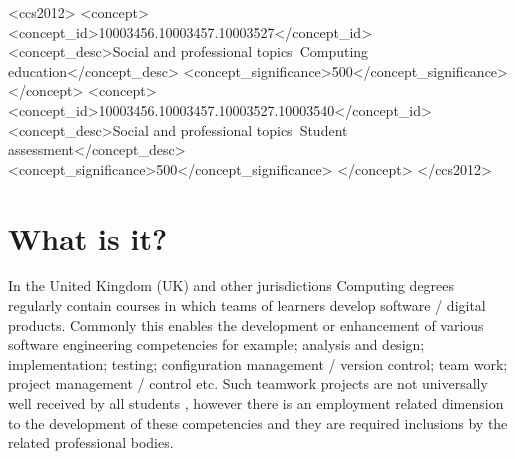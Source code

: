 \documentclass[sigconf, anonymous=true]{acmart}
\begin{document}
\begin{CCSXML}
<ccs2012>
   <concept>
       <concept_id>10003456.10003457.10003527</concept_id>
       <concept_desc>Social and professional topics~Computing education</concept_desc>
       <concept_significance>500</concept_significance>
       </concept>
   <concept>
       <concept_id>10003456.10003457.10003527.10003540</concept_id>
       <concept_desc>Social and professional topics~Student assessment</concept_desc>
       <concept_significance>500</concept_significance>
       </concept>
 </ccs2012>
\end{CCSXML}


\maketitle
\section{What is it?}	
\label{sec:What}
In the United Kingdom (UK) and other jurisdictions Computing degrees regularly contain courses in which teams of learners develop software / digital products. Commonly this enables the development or enhancement of various software engineering competencies for example; analysis and design; implementation; testing; configuration management / version control; team work; project management / control etc. Such teamwork projects are not universally well received by all students \cite{Gordon2010}, however there is an employment related dimension \cite{Thomas2003} to the development of these competencies and they are required inclusions by the related professional bodies\cite{Crick2020}. 
\end{document}
